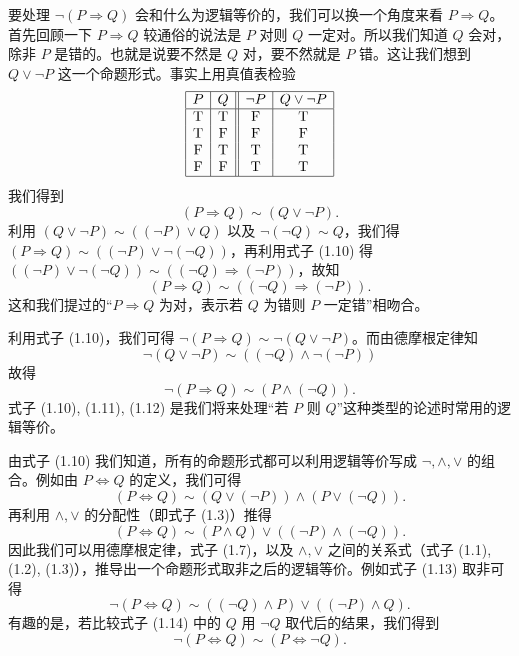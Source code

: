 要处理 \(\neg (P\Rightarrow Q)\) 会和什么为逻辑等价的，我们可以换一个角度来看 \(P\Rightarrow Q\)。首先回顾一下 \(P\Rightarrow Q\) 较通俗的说法是 \(P\) 对则 \(Q\) 一定对。所以我们知道 \(Q\) 会对，除非 \(P\) 是错的。也就是说要不然是 \(Q\) 对，要不然就是 \(P\) 错。这让我们想到 \(Q\lor \neg P\) 这一个命题形式。事实上用真值表检验
\[
\begin{array}{|c|c||c|c|}
\hline
P & Q & \neg P & Q\lor \neg P \\
\hline
\mathrm{T} & \mathrm{T} & \mathrm{F} & \mathrm{T} \\
\mathrm{T} & \mathrm{F} & \mathrm{F} & \mathrm{F} \\
\mathrm{F} & \mathrm{T} & \mathrm{T} & \mathrm{T} \\
\mathrm{F} & \mathrm{F} & \mathrm{T} & \mathrm{T} \\
\hline
\end{array}
\]
我们得到
\[
(P\Rightarrow Q)\sim (Q\lor \neg P). \tag{1.10}
\]
利用 \((Q\lor \neg P)\sim ((\neg P)\lor Q)\) 以及 \(\neg (\neg Q)\sim Q\)，我们得 \((P\Rightarrow Q)\sim ((\neg P)\lor \neg (\neg Q))\)，再利用式子 (1.10) 得 \(((\neg P)\lor \neg (\neg Q))\sim ((\neg Q)\Rightarrow (\neg P))\)，故知
\[
(P\Rightarrow Q)\sim ((\neg Q)\Rightarrow (\neg P)). \tag{1.11}
\]
这和我们提过的“\(P\Rightarrow Q\) 为对，表示若 \(Q\) 为错则 \(P\) 一定错”相吻合。

利用式子 (1.10)，我们可得 \(\neg (P\Rightarrow Q)\sim \neg (Q\lor \neg P)\)。而由德摩根定律知
\[
\neg (Q\lor \neg P)\sim ((\neg Q)\land \neg (\neg P))
\]
故得
\[
\neg (P\Rightarrow Q)\sim (P\land (\neg Q)). \tag{1.12}
\]
式子 (1.10), (1.11), (1.12) 是我们将来处理“若 \(P\) 则 \(Q\)”这种类型的论述时常用的逻辑等价。

由式子 (1.10) 我们知道，所有的命题形式都可以利用逻辑等价写成 \(\neg , \land , \lor\) 的组合。例如由 \(P\Leftrightarrow Q\) 的定义，我们可得
\[
(P\Leftrightarrow Q)\sim (Q\lor (\neg P))\land (P\lor (\neg Q)). \tag{1.13}
\]
再利用 \(\land , \lor\) 的分配性（即式子 (1.3)）推得
\[
(P\Leftrightarrow Q)\sim (P\land Q)\lor ((\neg P)\land (\neg Q)). \tag{1.14}
\]
因此我们可以用德摩根定律，式子 (1.7)，以及 \(\land , \lor\) 之间的关系式（式子 (1.1), (1.2), (1.3)），推导出一个命题形式取非之后的逻辑等价。例如式子 (1.13) 取非可得
\[
\neg (P\Leftrightarrow Q)\sim ((\neg Q)\land P)\lor ((\neg P)\land Q).
\]
有趣的是，若比较式子 (1.14) 中的 \(Q\) 用 \(\neg Q\) 取代后的结果，我们得到
\[
\neg (P\Leftrightarrow Q)\sim (P\Leftrightarrow \neg Q).
\]

